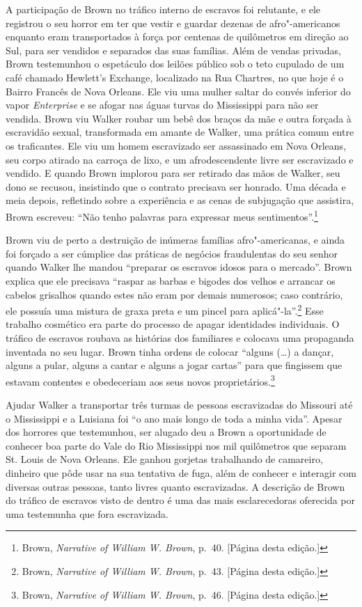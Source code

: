 A participação de Brown no tráfico interno de escravos foi relutante, e
ele registrou o seu horror em ter que vestir e guardar dezenas de
afro"-americanos enquanto eram transportados à força por centenas de
quilômetros em direção ao Sul, para ser vendidos e separados das suas
famílias. Além de vendas privadas, Brown testemunhou o espetáculo dos
leilões público sob o teto cupulado de um café chamado Hewlett's
Exchange, localizado na Rua Chartres, no que hoje é o Bairro Francês de
Nova Orleans. Ele viu uma mulher saltar do convés inferior do vapor
\emph{Enterprise} e se afogar nas águas turvas do Mississippi para não
ser vendida. Brown viu Walker roubar um bebê dos braços da mãe e outra
forçada à escravidão sexual, transformada em amante de Walker, uma
prática comum entre os traficantes. Ele viu um homem escravizado ser
assassinado em Nova Orleans, seu corpo atirado na carroça de lixo, e um
afrodescendente livre ser escravizado e vendido. E quando Brown implorou
para ser retirado das mãos de Walker, seu dono se recusou, insistindo
que o contrato precisava ser honrado. Uma década e meia depois,
refletindo sobre a experiência e as cenas de subjugação que assistira,
Brown escreveu: ``Não tenho palavras para expressar meus
sentimentos''.\footnote{Brown, \emph{Narrative of William W. Brown}, p.~40.
  {[}Página \pageref{ref6} desta edição.{]}}

Brown viu de perto a destruição de inúmeras famílias afro"-americanas, e
ainda foi forçado a ser cúmplice das práticas de negócios fraudulentas
do seu senhor quando Walker lhe mandou ``preparar os escravos
idosos para o mercado''. Brown explica que ele precisava ``raspar as
barbas e bigodes dos velhos e arrancar os cabelos grisalhos quando estes
não eram por demais numerosos; caso contrário, ele possuía uma mistura
de graxa preta e um pincel para aplicá"-la''.\footnote{Brown,
  \emph{Narrative of William W. Brown}, p.~43. {[}Página \pageref{ref7} desta
  edição.{]}} Esse trabalho cosmético era parte do processo de apagar
identidades individuais. O tráfico de escravos roubava as histórias dos
familiares e colocava uma propaganda inventada no seu lugar. Brown tinha
ordens de colocar ``alguns (\ldots{}) a dançar, alguns a pular, alguns a
cantar e alguns a jogar cartas'' para que fingissem que estavam
contentes e obedeceriam aos seus novos proprietários.\footnote{Brown,
  \emph{Narrative of William W. Brown}, p.~46. {[}Página \pageref{ref8} desta
  edição.{]}}

Ajudar Walker a transportar três turmas de pessoas escravizadas do
Missouri até o Mississippi e a Luisiana foi ``o ano mais longo de toda a
minha vida''. Apesar dos horrores que testemunhou, ser alugado deu a
Brown a oportunidade de conhecer boa parte do Vale do Rio Mississippi
nos mil quilômetros que separam St. Louis de Nova Orleans. Ele ganhou
gorjetas trabalhando de camareiro, dinheiro que pôde usar na sua
tentativa de fuga, além de conhecer e interagir com diversas outras
pessoas, tanto livres quanto escravizadas. A descrição de Brown do
tráfico de escravos visto de dentro é uma das mais esclarecedoras
oferecida por uma testemunha que fora escravizada.

